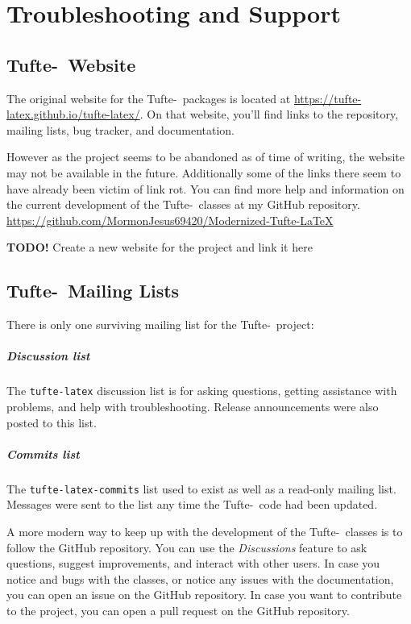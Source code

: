 \documentclass[a4paper]{tufte-book}
\newcommand{\TL}{Tufte-\hologo{LaTeX}\xspace}
\newcommand{\TODO}[1]{\textcolor{tufte-red}{\textbf{TODO!} #1}\xspace}
\begin{document}
\chapter{Troubleshooting and Support}\label{ch:troubleshooting}
\section{\TL\ Website}\label{sec:website}
The original website for the \TL\ packages is located at \url{https://tufte-latex.github.io/tufte-latex/}.
On that website, you'll find links to the  repository, mailing lists, bug tracker, and documentation.

However as the project seems to be abandoned as of time of writing, the website may not be available in the future.
Additionally some of the links there seem to have already been victim of link rot.
You can find more help and information on the current development of the \TL\ classes at my GitHub repository.
\url{https://github.com/MormonJesus69420/Modernized-Tufte-LaTeX}

\TODO{Create a new website for the project and link it here}


\section{\TL\ Mailing Lists}\label{sec:mailing-lists}
There is only one surviving mailing list for the \TL\ project:

\paragraph{Discussion list}
The \texttt{tufte-latex} discussion list is for asking questions, getting assistance with problems, and help with troubleshooting. 
Release announcements were also posted to this list.%

\paragraph{Commits list}
The \texttt{tufte-latex-commits} list used to exist as well as a read-only mailing list. 
Messages were sent to the list any time the \TL\ code had been updated.%

A more modern way to keep up with the development of the \TL\ classes is to follow the GitHub repository.
You can use the \textit{Discussions} feature to ask questions, suggest improvements, and interact with other users.%
In case you notice and bugs with the classes, or notice any issues with the documentation, you can open an issue on the GitHub repository.%
In case you want to contribute to the project, you can open a pull request on the GitHub repository.%
\end{document}
